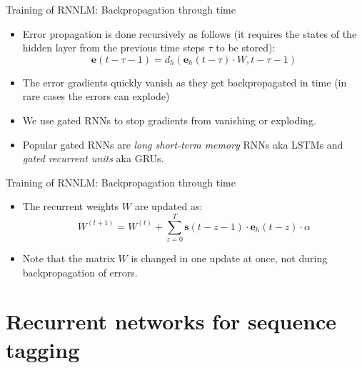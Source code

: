 \begin{frame}{Training of RNNLM: Backpropagation through time}
\begin{itemize}[<+->]
	\item Error propagation is done recursively as follows (it requires the states of the hidden layer from the previous time steps $\tau$ to be stored):
	\[ \mathbf{e}(t - \tau - 1) = d_h(\mathbf{e}_h(t-\tau) \cdot W, t - \tau -1) \]
	\item The error gradients quickly vanish as they get backpropagated in time (in rare cases the errors can explode)
	\item We use gated RNNs to stop gradients from vanishing or exploding. 
	\item Popular gated RNNs are \textit{long short-term memory} RNNs aka LSTMs and \textit{gated recurrent units} aka GRUs. 
\end{itemize}
\end{frame}

\begin{frame}{Training of RNNLM: Backpropagation through time}
\begin{itemize}[<+->]
	\item The recurrent weights $W$ are updated as:
	\[ W^{(t+1)} = W^{(t)} + \sum_{z=0}^T \mathbf{s}(t - z - 1) \cdot \mathbf{e}_h(t-z) \cdot \alpha \]
	\item Note that the matrix $W$ is changed in one update at once, not during backpropagation of errors.
\end{itemize}

\end{frame}

\newcommand{\postag}[1]{{\color{red}/#1}}
\newcommand{\nertag}[1]{{\color{blue}/#1}}

\section{Recurrent networks for sequence tagging}

